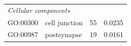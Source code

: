 \documentclass[10pt,letterpaper]{article}
\begin{document}
\begin{table}[]
\begin{tabular}{llcc}
\multicolumn{4}{l}{\textit{Cellular components}}                                                                                                                                                                                    \\
GO:00300                                & cell junction                                      & 55                                                                                       & 0.0235                              \\
GO:00987                                 & postsynapse                                        & 19                                                                                       & 0.0161                            
\end{tabular}
\end{table}

\end{document}
